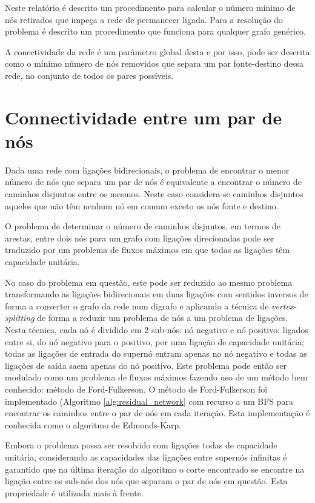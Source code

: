 \documentclass[12pt,a4paper]{article}
\begin{document}
Neste relatório é descrito um procedimento para calcular o número mínimo de nós retirados que impeça a rede de permanecer ligada. Para a resolução do problema é descrito um procedimento que funciona para qualquer grafo genérico.

A conectividade da rede é um parâmetro global desta e por isso, pode ser descrita como o mínimo número de nós removidos que separa um par fonte-destino dessa rede, no conjunto de todos os pares possíveis.

\section{Connectividade entre um par de nós}

Dada uma rede com ligações bidirecionais, o problema de encontrar o menor número de nós que separa um par de nós é equivalente a encontrar o número de caminhos disjuntos entre os mesmos. Neste caso considera-se caminhos disjuntos aqueles que não têm nenhum nó em comum exceto os nós fonte e destino.

O problema de determinar o número de caminhos disjuntos, em termos de arestas, entre dois nós para um grafo com ligações direcionadas pode ser traduzido por um problema de fluxos máximos em que todas as ligações têm capacidade unitária. 

No caso do problema em questão, este pode ser reduzido ao mesmo problema transformando as ligações bidirecionais em duas ligações com sentidos inversos de forma a converter o grafo da rede num digrafo e aplicando a técnica de \textit{vertex-splitting} de forma a reduzir um problema de nós a um problema de ligações. Nesta técnica, cada nó é dividido em 2 sub-nós: nó negativo e nó positivo; ligados entre si, do nó negativo para o positivo, por uma ligação de capacidade unitária; todas as ligações de entrada do supernó entram apenas no nó negativo e todas as ligações de saída saem apenas do nó positivo. Este problema pode então ser modulado como um problema de fluxos máximos fazendo uso de um método bem conhecido: método de Ford-Fulkerson. O método de Ford-Fulkerson foi implementado (Algoritmo \ref{alg:residual_network} com recurso a um BFS para encontrar os caminhos entre o par de nós em cada iteração. Esta implementação é conhecida como o algoritmo de Edmonds-Karp.

Embora o problema possa ser resolvido com ligações todas de capacidade unitária, considerando as capacidades das ligações entre supernós infinitas é garantido que na última iteração do algoritmo o corte encontrado se encontre na ligação entre os sub-nós dos nós que separam o par de nós em questão. Esta propriedade é utilizada mais à frente.
\end{document}
